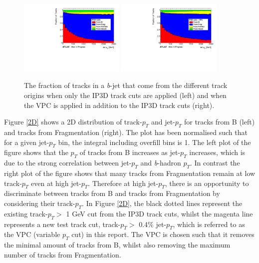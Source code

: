 \documentclass[12pt, onecolumn,notitlepage]{article}
\begin{document}
\begin{figure}[!htb]
	 \includegraphics[width=0.45\textwidth]{plots/vpc/frac_IP3D.pdf}
	 \includegraphics[width=0.45\textwidth]{plots/vpc/frac_vpc.pdf}
	 \caption{The fraction of tracks in a \textit{b}-jet that come from the different track origins when only the IP3D track cuts are applied (left)
           and when the VPC is applied in addition to the IP3D track cuts (right).}
         \label{jet_flav_frac}
\end{figure}


Figure \ref{2D} shows a 2D distribution of track-$p_T$ and jet-$p_T$ for tracks from B (left) and tracks from Fragmentation (right).
The plot has been normalised such that for a given jet-$p_T$ bin, the integral including overfill bins is 1.
The left plot of the figure shows that the $p_T$ of tracks from B increases as jet-$p_T$ increases,
which is due to the strong correlation between jet-$p_T$ and \textit{b}-hadron $p_T$.
In contrast the right plot of the figure shows that many tracks from Fragmentation remain at low track-$p_T$ even at high jet-$p_T$.
Therefore at high jet-$p_T$, there is an opportunity to discriminate between tracks from B and tracks from Fragmentation by considering their track-$p_T$.
In Figure \ref{2D}, the black dotted lines represent the existing track-$p_T >$ 1 GeV cut from the IP3D track cuts,
whilst the magenta line represents a new test track cut, track-$p_T > $
 0.4\% jet-$p_T$, which is referred to as the VPC (variable $p_T$ cut) in this report.   
The VPC is chosen such that it removes the minimal amount of tracks from B, 
whilst also removing the maximum number of tracks from Fragmentation. \\
\end{document}
